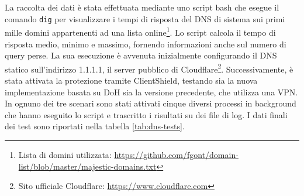 \documentclass[12pt,a4paper,openright,twoside]{book}
\begin{document}
La raccolta dei dati è stata effettuata mediante uno script bash che esegue il comando \texttt{dig} per visualizzare i tempi di risposta del \gls{DNS} di sistema sui primi mille domini appartenenti ad una lista online\footnote{Lista di domini utilizzata: \url{https://github.com/fgont/domain-list/blob/master/majestic-domains.txt}}.
Lo script calcola il tempo di risposta medio, minimo e massimo, fornendo informazioni anche sul numero di query perse.
La sua esecuzione è avvenuta inizialmente configurando il DNS statico sull’indirizzo 1.1.1.1, il server pubblico di Cloudflare\footnote{Sito ufficiale Cloudflare: \url{https://www.cloudflare.com}}. Successivamente, è stata attivata la protezione tramite ClientShield, testando sia la nuova implementazione basata su \gls{DoH} sia la versione precedente, che utilizza una \gls{VPN}.
In ognuno dei tre scenari sono stati attivati cinque diversi processi in background che hanno eseguito lo script e trascritto i risultati su dei file di log.
I dati finali dei test sono riportati nella tabella \ref{tab:dns-tests}.
\end{document}
